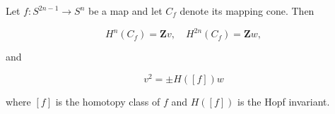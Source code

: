 Let $f: S^{2n-1} \rightarrow S^n$ be a map and let $C_f$ denote its mapping cone. Then

$$H^n(C_f) = \mathbf{Z}v, \quad H^{2n}(C_f) = \mathbf{Z}w,$$

and

$$v^2 = \pm H([f]) w$$

where $[f]$ is the homotopy class of $f$ and $H([f])$ is the Hopf invariant.
